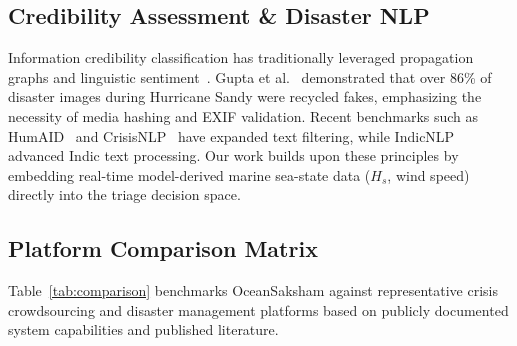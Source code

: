 \documentclass[conference]{IEEEtran}
\begin{document}
\subsection{Credibility Assessment \& Disaster NLP}
Information credibility classification has traditionally leveraged propagation graphs and linguistic sentiment~\cite{castillo2011information}. Gupta et al.~\cite{gupta2013faking} demonstrated that over 86\% of disaster images during Hurricane Sandy were recycled fakes, emphasizing the necessity of media hashing and EXIF validation. Recent benchmarks such as HumAID~\cite{alam2021humaid} and CrisisNLP~\cite{imran2015processing} have expanded text filtering, while IndicNLP~\cite{kakkar2020indicbert} advanced Indic text processing. Our work builds upon these principles by embedding real-time model-derived marine sea-state data ($H_s$, wind speed) directly into the triage decision space.

\subsection{Platform Comparison Matrix}
Table~\ref{tab:comparison} benchmarks OceanSaksham against representative crisis crowdsourcing and disaster management platforms based on publicly documented system capabilities and published literature.
\end{document}
